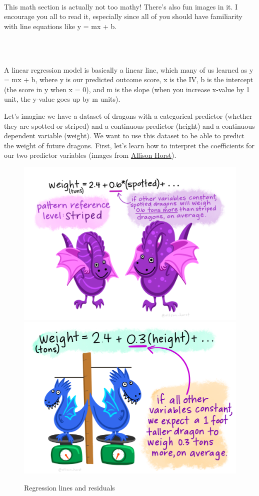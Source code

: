 \documentclass[
]{book}
\newenvironment{info}
    {
    \hline\\
    }
    { 
    \\\\\hline
    }
\begin{document}
\begin{info}
This math section is actually not too mathy! There's also fun images in
it. I encourage you all to read it, especially since all of you should
have familiarity with line equations like y = mx + b.
\end{info}

A linear regression model is basically a linear line, which many of us learned as y = mx + b, where y is our predicted outcome score, x is the IV, b is the intercept (the score in y when x = 0), and m is the slope (when you increase x-value by 1 unit, the y-value goes up by m units).

Let's imagine we have a dataset of dragons with a categorical predictor (whether they are spotted or striped) and a continuous predictor (height) and a continuous dependent variable (weight). We want to use this dataset to be able to predict the weight of future dragons. First, let's learn how to interpret the coefficients for our two predictor variables (images from \href{https://github.com/allisonhorst/stats-illustrations\#multiple-linear-regression-dragons-thread}{Allison Horst}).

\begin{figure}

{\centering \includegraphics[width=0.49\linewidth]{images/13-regression/dragon_categorical} \includegraphics[width=0.49\linewidth]{images/13-regression/dragons_continuous} 

}

\caption{Regression lines and residuals}\label{fig:unnamed-chunk-2}
\end{figure}
\end{document}
